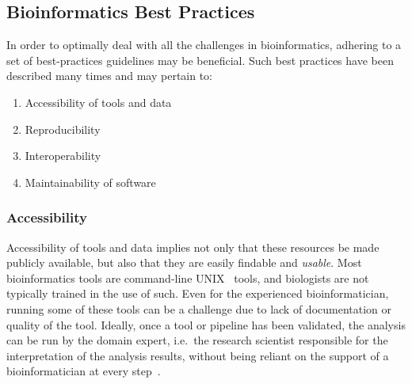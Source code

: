 \begin{justify}
\section{Bioinformatics Best Practices}

In order to optimally deal with all the challenges in bioinformatics, adhering to a set of best-practices guidelines may be beneficial. Such best practices have been described many times \cite{sandve2013ten,Seemann2013,wilson2014best,prlic2012ten,altschul2013anatomy,via2013best,Leprevost2014} and may pertain to:

\begin{enumerate}
    \itemsep-0.5em
    \item Accessibility of tools and data %
    \item Reproducibility %
    \item Interoperability %
    \item Maintainability of software %
\end{enumerate}


\subsubsection{Accessibility}
Accessibility of tools and data implies not only that these resources be made publicly available, but also that they are easily findable and \emph{usable}. Most bioinformatics tools are command-line UNIX~\cite{url-unix} tools, and biologists are not typically trained in the use of such. Even for the experienced bioinformatician, running some of these tools can be a challenge due to lack of documentation or quality of the tool. Ideally, once a tool or pipeline has been validated, the analysis can be run by the domain expert, i.e.\ the research scientist responsible for the interpretation of the analysis results, without being reliant on the support of a bioinformatician at every step~\cite{kumar2007bioinformatics}.


\end{justify}
